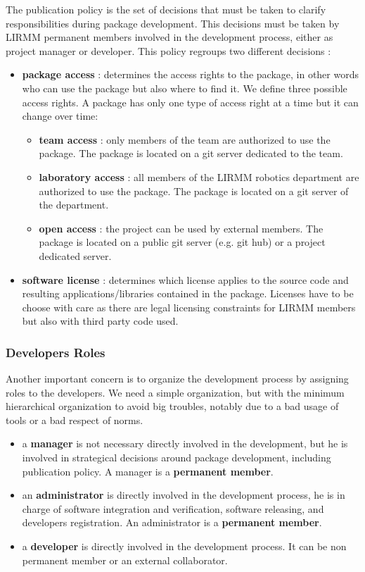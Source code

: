 \documentclass[12pt,a4paper]{article}
\begin{document}
The publication policy is the set of decisions that must be taken to clarify responsibilities during package development. This decisions must be taken by LIRMM permanent members involved in the development process, either as project manager or developer. This policy regroups two different decisions :
\begin{itemize}
\item \textbf{package access} : determines the access rights to the package, in other words who can use the package but also where to find it. We define three possible access rights. A package has only one type of access right at a time but it can change over time:
\begin{itemize}
\item \textbf{team access} : only members of the team are authorized to use the package. The package is located on a git server dedicated to the team.
\item \textbf{laboratory access} : all members of the LIRMM robotics department are authorized to use the package. The package is located on a git server of the department.
\item \textbf{open access} : the project can be used by external members. The package is located on a public git server (e.g. git hub) or a project dedicated server.
\end{itemize}

\item \textbf{software license} : determines which license applies to the source code and resulting applications/libraries contained in the package. Licenses have to be choose with care as there are legal licensing constraints for LIRMM members but also with third party code used.

\end{itemize}

\subsubsection{Developers Roles}

Another important concern is to organize the development process by assigning roles to the developers. We need a simple organization, but with the minimum hierarchical organization to avoid big troubles, notably due to a bad usage of tools or a bad respect of norms.
\begin{itemize}
\item a \textbf{manager} is not necessary directly involved in the development, but he is involved in strategical decisions around package development, including publication policy. A manager is a \textbf{permanent member}.
\item an \textbf{administrator} is directly involved in the development process, he is in charge of software integration and verification, software releasing, and developers registration. An administrator is a \textbf{permanent member}.
\item a \textbf{developer} is directly involved in the development process. It can be non permanent member or an external collaborator.
\end{itemize}
\end{document}
